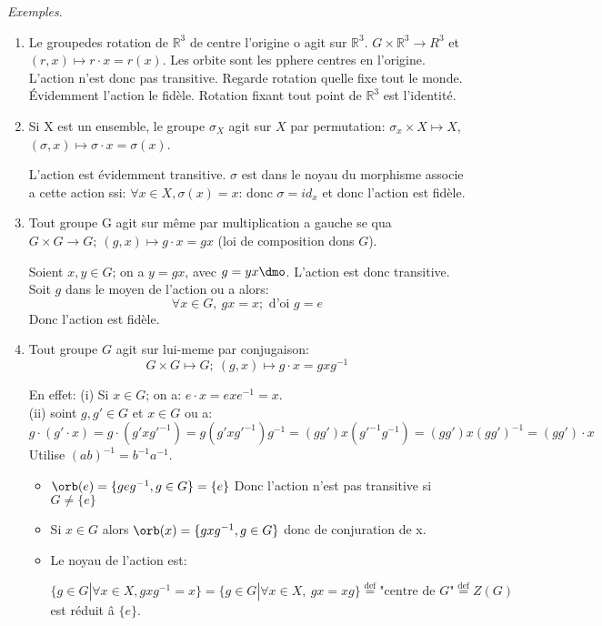 \emph{Exemples}.
\begin{enumerate}
	\item Le groupedes rotation de $\mathbb{R}^3$ de centre l'origine o agit sur $\mathbb{R}^3$. $G\times\mathbb{R}^3\rightarrow{R}^3$ et $(r, x)\mapsto r\cdot x=r(x).$
	Les orbite sont les pphere centres en l'origine. L'action n'est donc pas transitive. Regarde rotation quelle fixe tout le monde. Évidemment l'action le fidèle. Rotation fixant tout point de $\mathbb{R}^3$ est l'identité.
	\item Si X est un ensemble, le groupe $\sigma_X$ agit sur $X$ par permutation:
	$\sigma_x \times X\mapsto X$, $(\sigma, x)\mapsto \sigma\cdot x=\sigma(x)$.
	
	L'action est évidemment transitive. $\sigma$ est dans le noyau du morphisme associe a cette action ssi: $\forall x\in X, \sigma(x)=x$: donc $\sigma =id_x$ et donc l'action est fidèle.
	\item Tout groupe G agit sur même par multiplication a gauche se qua $G\times G \rightarrow G;\ (g,x)\mapsto g\cdot x=gx$ (loi de composition dons $G$).
	
	Soient $x, y\in G$; on a $y=gx$, avec $g=yx\dmo$. L'action est donc transitive.
	Soit $g$ dans le moyen de l'action ou a alors:
	$$\forall x\in G,\ gx=x; \mbox{ d'oi } g=e$$
	Donc l'action est fidèle.
	\item Tout groupe $G$ agit sur lui-meme par conjugaison:
	$$G\times G\mapsto G;\ (g,x)\mapsto g\cdot x=gxg^{-1}$$
	
	En effet: (i) Si $x\in G$; on a: $e\cdot x = exe^{-1} = x$.\\
	(ii)  soint $g, g'\in G$ et $x\in G$ ou a:
	$$g\cdot (g'\cdot x)=g\cdot (g'xg'^{-1})=g(g'xg'^{-1})g^{-1}=(gg')x(g'^{-1}g^{-1})=(gg')x(gg')^{-1}=(gg')\cdot x$$
	Utilise $(ab)^{-1}=b^{-1}a^{-1}$.
	\begin{itemize} 
	\item $\orb(e)=\{geg^{-1}, g\in G\}=\{e\}$ Donc l'action n'est pas transitive si $G\neq\{e\}$ \\%
	\item Si $x\in G$ alors $\orb(x)=\{gxg^{-1}, g\in G\}$ donc de conjuration de x.\\
	\item Le noyau de l'action est:	

	$$\{g\in G | \forall x\in X, gxg^{-1} = x\} = \{g\in G | \forall x \in X,\ gx=xg\}\overset{\text{def}}{=}\text{"centre de $G$"}\overset{\text{def}}{=} Z(G)$$
	est réduit â $\{e\}$.
	\end{itemize}
\end{enumerate}

